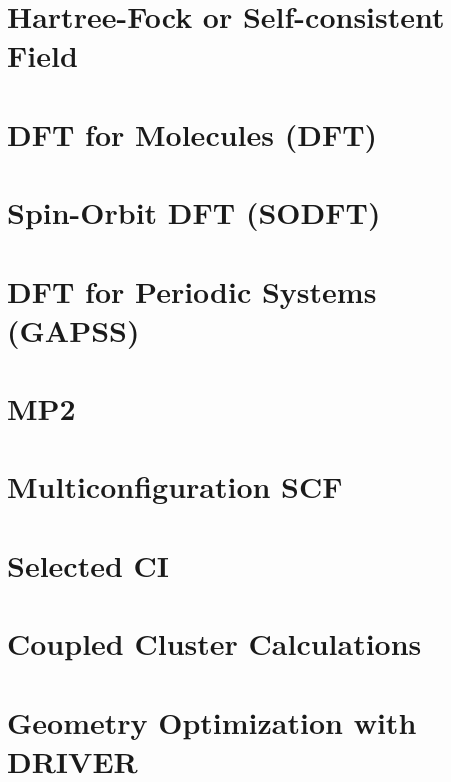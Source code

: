 \documentclass[12pt,fleqn]{book}
\begin{document}
\chapter{Hartree-Fock or Self-consistent Field} 


\chapter{DFT for Molecules (DFT)}


\chapter{Spin-Orbit DFT (SODFT)}


\chapter{DFT for Periodic Systems (GAPSS)}


\chapter{MP2}


\chapter{Multiconfiguration SCF}


\chapter{Selected CI}


\chapter{Coupled Cluster Calculations}


%


\chapter{Geometry Optimization with DRIVER}

\end{document}

